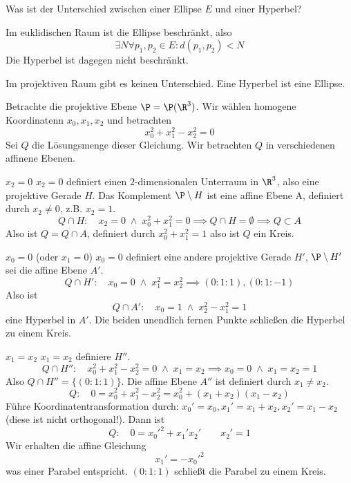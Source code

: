 \documentclass[a4paper, 10pt]{scrbook}
\begin{document}
\begin{ex}[Quadriken]
	Was ist der Unterschied zwischen einer Ellipse $E$ und einer Hyperbel?

	Im euklidischen Raum ist die Ellipse beschränkt, also
	\[
		\exists N \forall p_1,p_2 \in E : d(p_1,p_2) < N
	\]
	Die Hyperbel ist dagegen nicht beschränkt.

	Im projektiven Raum gibt es keinen Unterschied.
	Eine Hyperbel ist eine Ellipse.

	Betrachte die projektive Ebene $\P = \P(\R^3)$.
	Wir wählen homogene Koordinatenn $x_0,x_1,x_2$ und betrachten
	\[
		x_0^2 + x_1^2 - x_2^2 = 0
	\]
	Sei $Q$ die Lösungsmenge dieser Gleichung.
	Wir betrachten $Q$ in verschiedenen affinene Ebenen.
	\begin{seg}{$x_2=0$}
		$x_2=0$ definiert einen $2$-dimensionalen Unterraum in $\R^3$, also eine projektive Gerade $H$.
		Das Komplement $\P\setminus H$ ist eine affine Ebene A, definiert durch $x_2 \neq 0$, z.B. $x_2=1$.
		\[
			Q \cap H : \quad x_2 = 0 \;\land\; x_0^2+x_1^2 = 0 \implies Q \cap H = \emptyset \implies Q \subset A
		\]
		Also ist $Q = Q \cap A$, definiert durch $x_0^2 + x_1^2 = 1$ also ist $Q$ ein Kreis.
	\end{seg}
	\begin{seg}{$x_0=0$ (oder $x_1=0$)}
		$x_0=0$ definiert eine andere projektive Gerade $H'$, $\P\setminus H'$ sei die affine Ebene $A'$.
		\[
			Q \cap H': \quad x_0 = 0 \;\land\; x_1^2 = x_2^2 \implies (0:1:1), (0:1:-1)
		\]
		Also ist
		\[
			Q \cap A' : \quad x_0=1 \;\land\; x_2^2-x_1^2=1
		\]
		eine Hyperbel in $A'$.
		Die beiden unendlich fernen Punkte schließen die Hyperbel zu einem Kreis.
	\end{seg}
	\begin{seg}{$x_1=x_2$}
		$x_1=x_2$ definiere $H''$.
		\[
			Q \cap H'' : \quad x_0^2 + x_1^2 - x_2^2 = 0 \;\land\; x_1=x_2 \implies  x_0=0 \;\land\; x_1=x_2=1
		\]
		Also $Q\cap H'' = \{(0:1:1)\}$.
		Die affine Ebene $A''$ ist definiert durch $x_1\neq x_2$.
		\[
			Q: \quad 0 = x_0^2 + x_1^2 -x_2^2 = x_0^2 + (x_1+x_2)(x_1-x_2)
		\]
		Führe Koordinatentransformation durch: $x_0' = x_0, x_1'=x_1+x_2, x_2'=x_1-x_2$ (diese ist nicht orthogonal!).
		Dann ist
		\[
			Q: \quad 0 =x_0'^2 + x_1'x_2' \qquad x_2'=1
		\]
		Wir erhalten die affine Gleichung
		\[
			x_1' = -x_0'^2
		\]
		was einer Parabel entspricht.
		$(0:1:1)$ schließt die Parabel zu einem Kreis.
	\end{seg}
\end{ex}
\end{document}
